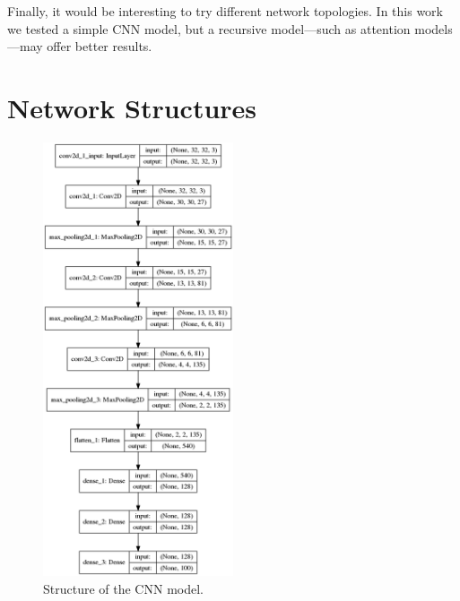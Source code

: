 \documentclass[]{article}
\begin{document}
Finally, it would be interesting to try different network topologies. In this work we tested a simple CNN model, but a recursive model---such as attention models \cite{itti1998model}---may offer better results.

{}


\pagebreak

\appendix

\section{Network Structures}

\begin{figure}[H]
	\centering
	\includegraphics[width=0.5\textwidth]{baseline}
	\caption{Structure of the CNN model.}
	\label{f:baseline}
\end{figure}
\end{document}
